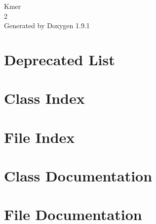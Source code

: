 \let\mypdfximage\pdfximage\def\pdfximage{\immediate\mypdfximage}\documentclass[twoside]{book}
\newcommand{\+}{\discretionary{\mbox{\scriptsize$\hookleftarrow$}}{}{}}
\newcommand{\clearemptydoublepage}{%
  \newpage{\pagestyle{empty}\cleardoublepage}%
}
\begin{document}
\raggedbottom

\hypersetup{pageanchor=false,
             bookmarksnumbered=true,
             pdfencoding=unicode
            }
\begin{titlepage}
\vspace*{7cm}
\begin{center}%
{\Large Kmer \\[1ex]\large 2 }\\
\vspace*{1cm}
{\large Generated by Doxygen 1.9.1}\\
\end{center}
\end{titlepage}
\clearemptydoublepage
{}
\tableofcontents
\clearemptydoublepage
{}
\hypersetup{pageanchor=true}

\chapter{Deprecated List}
\label{deprecated}

\chapter{Class Index}

\chapter{File Index}

\chapter{Class Documentation}



\chapter{File Documentation}








\backmatter
\newpage
{}
\clearemptydoublepage
{}
\printindex
\end{document}
